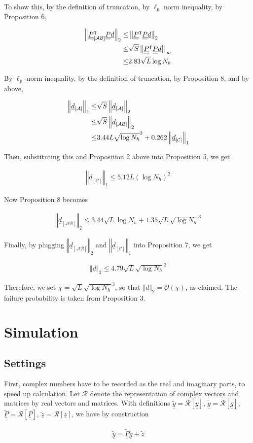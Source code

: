 \documentclass[journal]{IEEEtran}
\newcommand {\m} [1] {\( #1 \)}
\newcommand {\V} [1] {\underline {#1}}
\newcommand {\M} [1] {\underline {\underline {#1}}}
\newcommand {\RB} [1] {\left( #1 \right)}
\newcommand {\SB} [1] {\left[ #1 \right]}
\newcommand {\VNm} [1] {\left \Vert #1 \right \Vert}
\newcommand {\R} [1] {\sqrt {#1}}
\newcommand {\Disp} [1] {
   \begin {align*}
      #1
   \end {align*}
}
\begin{document}
To show this, by the definition of truncation, by \m {\ell_p} norm inequality, by Proposition 6,
\Disp {
\VNm {\M {P} _{\SB {\mathcal {AB}}}^\intercal \M {P} \V {d}} _2
\leq &\VNm {\M {P}^\intercal \M {P} \V {d}} _2 \notag \\
\leq &\R {S} \VNm {\M {P}^\intercal \M {P} \V {d}} _\infty \notag \\
\leq &2.83 \R {L} \log N_h
}
By \m {\ell_p}-norm inequality, by the definition of truncation, by Proposition 8, and by above,
\Disp {
\VNm {\V {d} _{\SB{\mathcal {A}}}} _1
\leq &\R {S} \VNm {\V {d} _{\SB{\mathcal {A}}}} _2 \notag \\
\leq &\R {S} \VNm {\V {d} _{\SB{\mathcal {AB}}}} _2 \notag \\
\leq &3.44 L \R {\log N_h}^3
+0.262 \VNm {\V {d} _{\SB{\mathcal {C}}}} _1
}
Then, substituting this and Proposition 2 above into Proposition 5, we get
\Disp {
\VNm {\V {d} _{\SB{\mathcal {C}}}} _1
\leq 5.12 L \RB {\log N_h}^2
}
Now Proposition 8 becomes
\Disp {
\VNm {\V {d} _{\SB{\mathcal {AB}}}} _2
\leq 3.44 \R {L} \log N_h + 1.35 \R {L} \R {\log N_h} ^3
}
Finally, by plugging \m {\VNm {\V {d} _{\SB{\mathcal {AB}}}} _2} and \m {\VNm {\V {d} _{\SB{\mathcal {C}}}} _1} into Proposition 7, we get
\Disp {
\VNm {\V {d}} _2
\leq 4.79 \R {L} \R {\log N_h}^3
}
Therefore, we set \m {\chi = \R {L} \R {\log N_h}^3}, so that \m {\VNm {\V {d}} _2 = \mathcal {O} \RB {\chi}}, as claimed.
The failure probability is taken from Proposition 3.



\section{Simulation}

\subsection{Settings}

First, complex numbers have to be recorded as the real and imaginary parts, to speed up calculation.
Let \m {\mathcal {R}} denote the representation of complex vectors and matrices by real vectors and matrices.
With definitions \m {\tilde {\V {y}} = \mathcal {R} \SB {\V {y}}},
\m {\tilde {\V {g}} = \mathcal {R} \SB {\V {g}}},
\m {\tilde {\M {P}} = \mathcal {R} \SB {\M {P}}},
\m {\tilde {\V {z}} = \mathcal {R} \SB {\V {z}}},
we have by construction
%
\Disp {
\V {\tilde {y}}
= \M {\tilde {P}} \V {\tilde {g}} +\V {\tilde {z}} 
}
\end{document}
